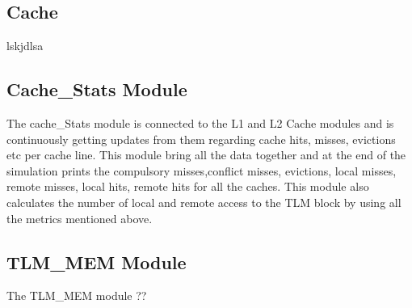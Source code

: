 \documentclass{listhesis}
\begin{document}
\subsection{Cache}
lskjdlsa
\subsection{Cache{\_}Stats Module}
The cache{\_}Stats module is connected to the L1 and L2 Cache modules and is continuously getting updates from them regarding cache hits, misses, evictions etc per cache line. This module bring all the data together and at the end of the simulation prints the compulsory misses,conflict misses, evictions, local misses, remote misses, local hits, remote hits for all the caches. This module also calculates the number of local and remote access to the TLM block by using all the metrics mentioned above.
\subsection{TLM{\_}MEM Module}
The TLM{\_}MEM module ??
\end{document}
